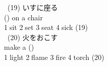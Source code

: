 \documentclass[uplatex]{jsarticle}
\begin{document}
\ (19) いすに座る\\
\hspace{10mm}(\hspace{10mm}) on a chair\\
\hspace{10mm}\textcircled{\normalsize1}sit \textcircled{\normalsize2}set 
\textcircled{\normalsize3}seat \textcircled{\normalsize4}sick 
\hspace{\fill}(19)\underline{\hspace{35mm}}\\
\ (20) 火をおこす\\
\hspace{10mm}make a (\hspace{10mm})\\
\hspace{10mm}\textcircled{\normalsize1}light \textcircled{\normalsize2}flame 
\textcircled{\normalsize3}fire \textcircled{\normalsize4}torch 
\hspace{\fill}(20)\underline{\hspace{35mm}}\\
% 
\end{document}
